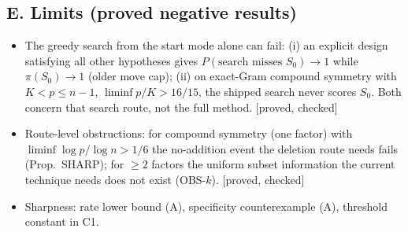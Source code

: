 \documentclass[10pt]{article}
\newcommand{\st}[1]{\textsf{\small[#1]}}
\begin{document}
\subsection*{E. Limits (proved negative results)}
\begin{itemize}
\item The greedy search from the start mode alone can fail: (i) an explicit design satisfying all other hypotheses gives $P(\text{search misses }S_0)\to1$ while $\pi(S_0)\to1$ (older move cap); (ii) on exact-Gram compound symmetry with $K<p\le n-1$, $\liminf p/K>16/15$, the shipped search never scores $S_0$. Both concern that search route, not the full method. \st{proved, checked}
\item Route-level obstructions: for compound symmetry (one factor) with $\liminf\log p/\log n>1/6$ the no-addition event the deletion route needs fails (Prop.\ SHARP); for $\ge2$ factors the uniform subset information the current technique needs does not exist (OBS-$k$). \st{proved, checked}
\item Sharpness: rate lower bound (A), specificity counterexample (A), threshold constant in C1.
\end{itemize}

\end{document}
